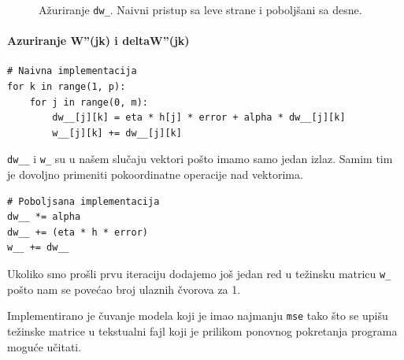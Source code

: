 \documentclass[a4paper]{article}
\begin{document}
\begin{figure}[h!]
    \centering
    \caption{Ažuriranje \texttt{dw\_}. Naivni pristup sa leve strane i poboljšani sa desne.}
    \label{fig:azuriranjewp}
\end{figure}

\pagebreak
\paragraph{Azuriranje W''(jk) i deltaW''(jk)}

\begin{verbatim}
# Naivna implementacija
for k in range(1, p):
    for j in range(0, m):
        dw__[j][k] = eta * h[j] * error + alpha * dw__[j][k]
        w__[j][k] += dw__[j][k]
\end{verbatim}
\texttt{dw\_\_} i \texttt{w\_} su u našem slučaju vektori pošto imamo samo jedan izlaz. Samim tim je dovoljno primeniti pokoordinatne operacije nad vektorima.
\begin{verbatim}
# Poboljsana implementacija
dw__ *= alpha
dw__ += (eta * h * error)
w__ += dw__
\end{verbatim}

Ukoliko smo prošli prvu iteraciju dodajemo još jedan red u težinsku matricu \texttt{w\_} pošto nam se povećao broj ulaznih čvorova za 1.

Implementirano je čuvanje modela koji je imao najmanju \texttt{mse} tako što se upišu težinske matrice u tekstualni fajl koji je prilikom ponovnog pokretanja programa moguće učitati.
\end{document}
